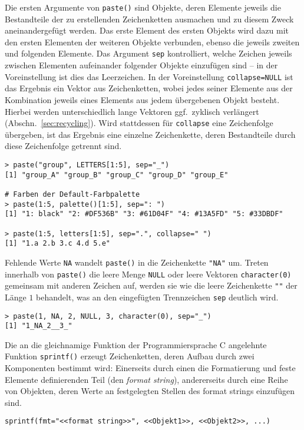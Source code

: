 Die ersten Argumente von \lstinline!paste()! sind Objekte, deren Elemente jeweils die Bestandteile der zu erstellenden Zeichenketten ausmachen und zu diesem Zweck aneinandergefügt werden. Das erste Element des ersten Objekts wird dazu mit den ersten Elementen der weiteren Objekte verbunden, ebenso die jeweils zweiten und folgenden Elemente. Das Argument \lstinline!sep! kontrolliert, welche Zeichen jeweils zwischen Elementen aufeinander folgender Objekte einzufügen sind -- in der Voreinstellung ist dies das Leerzeichen. In der Voreinstellung \lstinline!collapse=NULL! ist das Ergebnis ein Vektor aus Zeichenketten, wobei jedes seiner Elemente aus der Kombination jeweils eines Elements aus jedem übergebenen Objekt besteht. Hierbei werden unterschiedlich lange Vektoren ggf.\ zyklisch verlängert (Abschn.\ \ref{sec:recycling}). Wird stattdessen für \lstinline!collapse! eine Zeichenfolge übergeben, ist das Ergebnis eine einzelne Zeichenkette, deren Bestandteile durch diese Zeichenfolge getrennt sind.
\begin{lstlisting}
> paste("group", LETTERS[1:5], sep="_")
[1] "group_A" "group_B" "group_C" "group_D" "group_E"

# Farben der Default-Farbpalette
> paste(1:5, palette()[1:5], sep=": ")
[1] "1: black" "2: #DF536B" "3: #61D04F" "4: #13A5FD" "5: #33DBDF"

> paste(1:5, letters[1:5], sep=".", collapse=" ")
[1] "1.a 2.b 3.c 4.d 5.e"
\end{lstlisting}

Fehlende Werte \lstinline!NA! wandelt \lstinline!paste()! in die Zeichenkette \lstinline!"NA"! um. Treten innerhalb von \lstinline!paste()! die leere Menge \lstinline!NULL! oder leere Vektoren \lstinline!character(0)! gemeinsam mit anderen Zeichen auf, werden sie wie die leere Zeichenkette \lstinline!""! der Länge $1$ behandelt, was an den eingefügten Trennzeichen \lstinline!sep! deutlich wird.
\begin{lstlisting}
> paste(1, NA, 2, NULL, 3, character(0), sep="_")
[1] "1_NA_2__3_"
\end{lstlisting}

Die an die gleichnamige Funktion der Programmiersprache C angelehnte Funktion \lstinline!sprintf()! erzeugt Zeichenketten, deren Aufbau durch zwei Komponenten bestimmt wird: Einerseits durch einen die Formatierung und feste Elemente definierenden Teil (den \emph{format string}), andererseits durch eine Reihe von Objekten, deren Werte an festgelegten Stellen des format strings einzufügen sind.
\begin{lstlisting}
sprintf(fmt="<<format string>>", <<Objekt1>>, <<Objekt2>>, ...)
\end{lstlisting}

